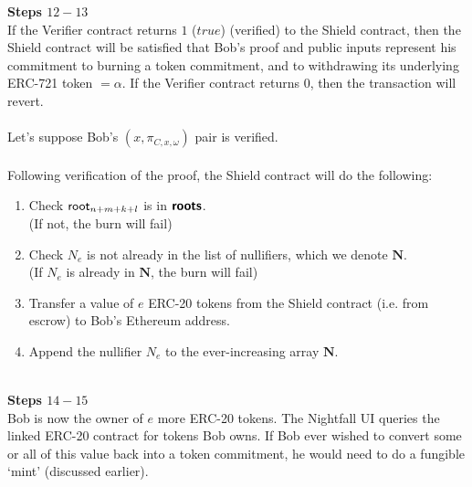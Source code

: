 \textbf{Steps $12 - 13$}
\ \\
If the Verifier contract returns $1$ ($true$) (verified) to the Shield contract, then the Shield contract will be satisfied that Bob's proof and public inputs represent his commitment to burning a token commitment, and to withdrawing its underlying ERC-721 token $=\alpha$. If the Verifier contract returns $0$, then the transaction will revert.\\
\\
Let's suppose Bob's $(x, \pi_{C,x,\omega})$ pair is verified.\\
\\
Following verification of the proof, the Shield contract will do the following:
\begin{enumerate}
  \item Check $\mathsf{root}_{n+m+k+l}$ is in $\bm{\mathsf{roots}}$.\\
    (If not, the burn will fail)
  \item Check $N_e$ is not already in the list of nullifiers, which we denote $\bm{N}$.\\
    (If $N_e$ is already in $\bm{N}$, the burn will fail)
  \item Transfer a value of $e$ ERC-20 tokens from the Shield contract (i.e. from escrow) to Bob's Ethereum address.
  \item Append the nullifier $N_e$ to the ever-increasing array $\bm N$.
\end{enumerate}
\ \\

\textbf{Steps $14 - 15$}
\ \\
Bob is now the owner of $e$ more ERC-20 tokens. The Nightfall UI queries the linked ERC-20 contract for tokens Bob owns.
If Bob ever wished to convert some or all of this value back into a token commitment, he would need to do a fungible `mint' (discussed earlier).